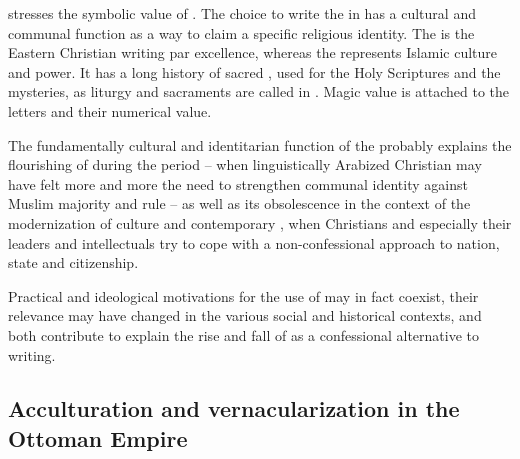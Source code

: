 \documentclass[output=paper,colorlinks,citecolor=brown,arabfont,syriacfont]{langscibook}
\begin{document}
\citet[71]{briquel_chatonnet2015} stresses the symbolic value of . The choice to write the  in   has a cultural and communal function as a way to claim a specific religious identity. The   is the Eastern Christian writing par excellence, whereas the   represents Islamic culture and power. It has a long history of sacred , used for the Holy Scriptures and the mysteries, as liturgy and sacraments are called in . Magic value is attached to the  letters and their numerical value. 


The fundamentally cultural and identitarian function of the  probably explains the flourishing of  during the  period -- when linguistically Arabized Christian  may have felt more and more the need to strengthen communal identity against Muslim majority and rule -- as well as its obsolescence in the context of the modernization of  culture and contemporary  , when Christians and especially their leaders and intellectuals try to cope with a non-confessional approach to nation, state and citizenship.

Practical and ideological motivations for the use of  may in fact coexist, their relevance may have changed in the various social and historical contexts, and both contribute to explain the rise and fall of  as a confessional alternative to  writing.

    \subsection{Acculturation and vernacularization in the Ottoman Empire}\label{ch.3.6.ss.2.4}
\end{document}
